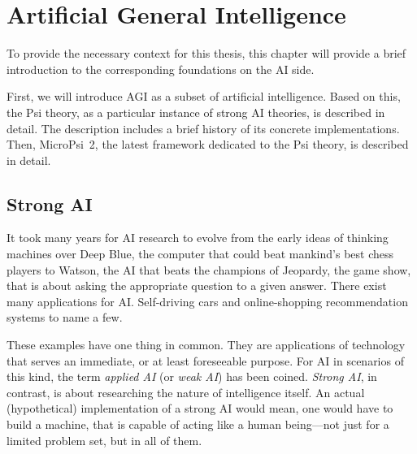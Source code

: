 


\chapter{Artificial General Intelligence}
\label{chap:2}
To provide the necessary context for this thesis, this chapter will provide a brief introduction to the corresponding foundations on the AI side.


First, we will introduce AGI as a subset of artificial intelligence. Based on this, the Psi theory, as a particular instance of strong AI theories, is described in detail. The description includes a brief history of its concrete implementations. Then, MicroPsi~2, the latest framework dedicated to the Psi theory, is described in detail.

    \section{Strong AI}
    
    
It took many years for AI research to evolve from the early ideas of thinking machines over Deep Blue, the computer that could beat mankind's best chess players to Watson, the AI that beats the champions of Jeopardy, the game show, that is about asking the appropriate question to a given answer. There exist many applications for AI. Self-driving cars and online-shopping recommendation systems to name a few.


These examples have one thing in common. They are applications of technology that serves an immediate, or at least foreseeable purpose. For AI in scenarios of this kind, the term \emph{applied AI} (or \emph{weak AI}) has been coined. \emph{Strong AI}, in contrast, is about researching the nature of intelligence itself. An actual (hypothetical) implementation of a strong AI would mean, one would have to build a machine, that is capable of acting like a human being---not just for a limited problem set, but in all of them. 

